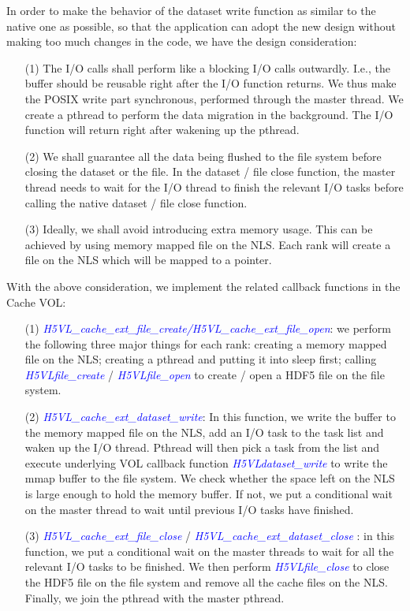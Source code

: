 \documentclass[aps, prb, 11pt, notitlepage]{revtex4-1}
\def\function#1{\textcolor{blue}{{\it #1}}}
\begin{document}
In order to make the behavior of the dataset write function as similar to the native one as possible, so that the application can adopt the new design without making too much changes in the code, we have the design consideration: 
\begin{itemize}
\item [(1)] The I/O calls shall perform like a blocking I/O calls outwardly. I.e., the buffer should be reusable right after the I/O function returns. We thus make the POSIX write part synchronous, performed through the master thread. We create a pthread to perform the data migration in the background. The I/O function will return right after wakening up the pthread. 
\item [(2)] We shall guarantee all the data being flushed to the file system before closing the dataset or the file. In the dataset / file close function, the master thread needs to wait for the I/O thread to finish the relevant I/O tasks before calling the native dataset / file close function. 
\item [(3)] Ideally, we shall avoid introducing extra memory usage. This can be achieved by using memory mapped file on the NLS. Each rank will create a file on the NLS which will be mapped to a pointer. 
\end{itemize}

With the above consideration, we implement the related callback functions in the Cache VOL: 
\begin{itemize}
\item [(1)] \function{H5VL\_cache\_ext\_file\_create/H5VL\_cache\_ext\_file\_open}: we perform the following three major things for each rank: creating a memory mapped file on the NLS; creating a pthread and putting it into sleep first; calling \function{H5VLfile\_create} / \function{H5VLfile\_open} to create / open a HDF5 file on the file system. 
\item [(2)] \function{H5VL\_cache\_ext\_dataset\_write}: In this function, we write the buffer to the memory mapped file on the NLS, add an I/O task to the task list and waken up the I/O thread. Pthread will then pick a task from the list and execute underlying VOL callback function \function{H5VLdataset\_write} to write the mmap buffer to the file system. We check whether the space left on the NLS is large enough to hold the memory buffer. If not, we put a conditional wait on the master thread to wait until previous I/O tasks have finished. 
\item [(3)]\function{H5VL\_cache\_ext\_file\_close} / \function{H5VL\_cache\_ext\_dataset\_close} : in this function, we put a conditional wait on the master threads to wait for all the relevant I/O tasks to be finished. We then perform \function{H5VLfile\_close} to close the HDF5 file on the file system and remove all the cache files on the NLS. Finally, we join the pthread with the master pthread. 
\end{itemize}
\end{document}

